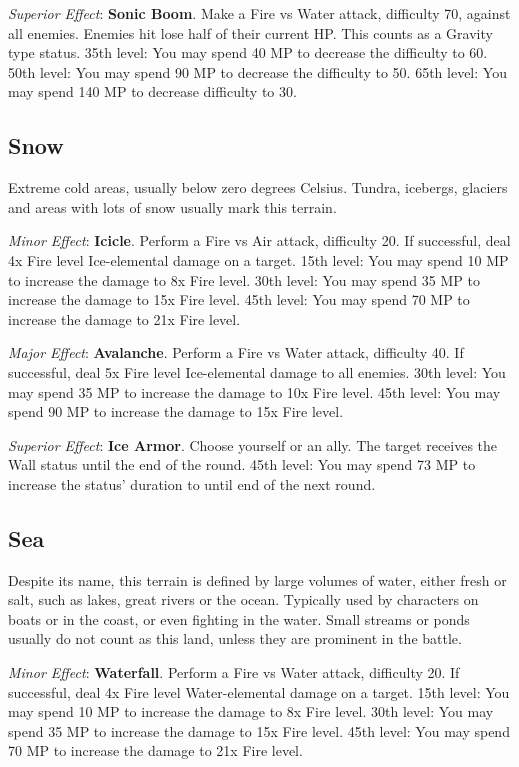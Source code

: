 \begin{multicols}{2}
\textit{Superior Effect}: \textbf{Sonic Boom}. Make a Fire vs Water attack, difficulty 70, against all enemies. Enemies hit lose half of their current HP\@. This counts as a Gravity type status. 35th level: You may spend 40 MP to decrease the difficulty to 60. 50th level: You may spend 90 MP to decrease the difficulty to 50. 65th level: You may spend 140 MP to decrease difficulty to 30.

\subsection*{Snow}\label{subsec:geo-snow}
Extreme cold areas, usually below zero degrees Celsius. Tundra, icebergs, glaciers and areas with lots of snow usually mark this terrain.

\textit{Minor Effect}: \textbf{Icicle}. Perform a Fire vs Air attack, difficulty 20. If successful, deal 4x Fire level Ice-elemental damage on a target. 15th level: You may spend 10 MP to increase the damage to 8x Fire level. 30th level: You may spend 35 MP to increase the damage to 15x Fire level. 45th level: You may spend 70 MP to increase the damage to 21x Fire level.

\textit{Major Effect}: \textbf{Avalanche}. Perform a Fire vs Water attack, difficulty 40. If successful, deal 5x Fire level Ice-elemental damage to all enemies. 30th level: You may spend 35 MP to increase the damage to 10x Fire level. 45th level: You may spend 90 MP to increase the damage to 15x Fire level.

\textit{Superior Effect}: \textbf{Ice Armor}. Choose yourself or an ally. The target receives the Wall status until the end of the round. 45th level: You may spend 73 MP to increase the status’ duration to until end of the next round.

\subsection*{Sea}\label{subsec:geo-sea}
Despite its name, this terrain is defined by large volumes of water, either fresh or salt, such as lakes, great rivers or the ocean. Typically used by characters on boats or in the coast, or even fighting in the water. Small streams or ponds usually do not count as this land, unless they are prominent in the battle.

\textit{Minor Effect}: \textbf{Waterfall}. Perform a Fire vs Water attack, difficulty 20. If successful, deal 4x Fire level Water-elemental damage on a target. 15th level: You may spend 10 MP to increase the damage to 8x Fire level. 30th level: You may spend 35 MP to increase the damage to 15x Fire level. 45th level: You may spend 70 MP to increase the damage to 21x Fire level.


\end{multicols}
